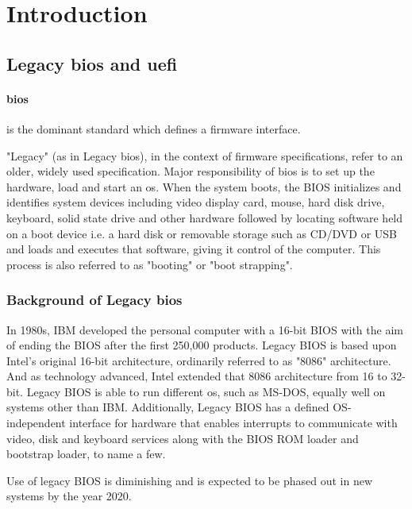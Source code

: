 \section{Introduction}

\subsection{Legacy \gls{bios} and \gls{uefi}}

\paragraph{\gls{bios}} is the dominant standard which defines a firmware interface.

"Legacy" (as in Legacy \gls{bios}), in the context of firmware specifications, refer to an older, widely used specification. Major responsibility of \gls{bios} is to set up the hardware, load and start an \gls{os}. When the system boots, the BIOS initializes and identifies system devices including video display card, mouse, hard disk drive, keyboard, solid state drive and other hardware followed by locating software held on a boot device i.e. a hard disk or removable storage such as CD/DVD or USB and loads and executes that software, giving it control of the computer. This process is also referred to as "booting" or "boot strapping".

\subsubsection{Background of Legacy \gls{bios}}
In 1980s, IBM developed the personal computer with a 16-bit BIOS with the aim of ending the BIOS after the first 250,000 products. Legacy BIOS is based upon Intel's original 16-bit architecture, ordinarily referred to as  "8086" architecture. And as technology advanced, Intel extended that 8086 architecture from 16 to 32-bit.
Legacy BIOS is able to run different \gls{os}, such as MS-DOS, equally well on systems other than IBM. Additionally, Legacy BIOS has a defined OS-independent interface for hardware that enables interrupts to communicate with video, disk and keyboard services along with the BIOS ROM loader and bootstrap loader, to name a few.

Use of legacy BIOS is diminishing and is expected to be phased out in new systems by the year 2020.

